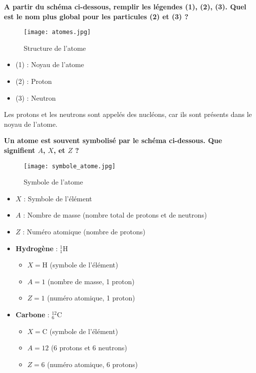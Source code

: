 \documentclass{exam}
\begin{document}
\begin{questions}
  \question[1] \textbf{A partir du schéma ci-dessous, remplir les légendes (1), (2), (3). Quel est le nom plus global pour les particules (2) et (3) ?}

  \begin{figure}[H]
    \centering
    \texttt{[image: atomes.jpg]}
    \caption{\label{} Structure de l'atome}
  \end{figure}

  \begin{itemize}
    \item (1) : Noyau de l'atome
    \item (2) : Proton
    \item (3) : Neutron
  \end{itemize}
  Les protons et les neutrons sont appelés des nucléons, car ils sont présents dans le noyau de l'atome.

  \question[1] \textbf{Un atome est souvent symbolisé par le schéma ci-dessous. Que signifient $A$, $X$, et $Z$ ?}

  \begin{figure}[H]
    \centering
    \texttt{[image: symbole\_atome.jpg]}
    \caption{\label{} Symbole de l'atome}
  \end{figure}

  \begin{itemize}
    \item $X$ : Symbole de l'élément
    \item $A$ : Nombre de masse (nombre total de protons et de neutrons)
    \item $Z$ : Numéro atomique (nombre de protons)
  \end{itemize}

  \begin{itemize}
    \item \textbf{Hydrogène} : $_{1}^{1}\text{H}$
    \begin{itemize}
        \item $X = \text{H}$ (symbole de l'élément)
        \item $A = 1$ (nombre de masse, 1 proton)
        \item $Z = 1$ (numéro atomique, 1 proton)
    \end{itemize}

    \item \textbf{Carbone} : $_{6}^{12}\text{C}$
    \begin{itemize}
        \item $X = \text{C}$ (symbole de l'élément)
        \item $A = 12$ (6 protons et 6 neutrons)
        \item $Z = 6$ (numéro atomique, 6 protons)
    \end{itemize}


\end{itemize}
\end{questions}
\end{document}
